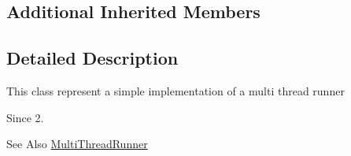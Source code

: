 \subsection*{Additional Inherited Members}


\subsection{Detailed Description}
This class represent a simple implementation of a multi thread runner

\begin{DoxySince}{Since}
2.
\end{DoxySince}
\begin{DoxySeeAlso}{See Also}
\hyperlink{classjenes_1_1utils_1_1multitasking_1_1_multi_thread_runner}{Multi\-Thread\-Runner} 
\end{DoxySeeAlso}


